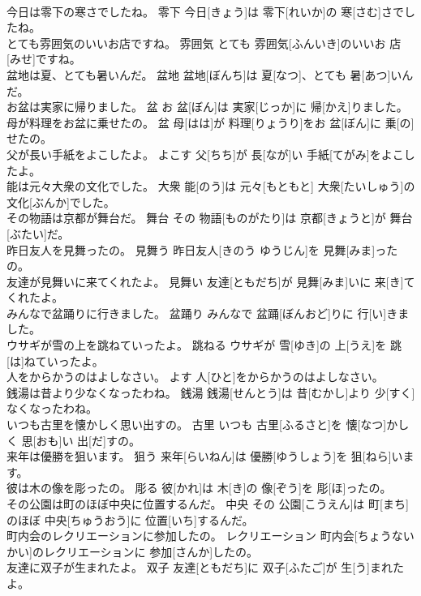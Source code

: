 \documentclass[8pt]{extreport}
\begin{document}
\begin{CJK}{UTF8}{min}
\\	今日は零下の寒さでしたね。	零下	今日[きょう]は 零下[れいか]の 寒[さむ]さでしたね。	
\\	とても雰囲気のいいお店ですね。	雰囲気	とても 雰囲気[ふんいき]のいいお 店[みせ]ですね。	
\\	盆地は夏、とても暑いんだ。	盆地	盆地[ぼんち]は 夏[なつ]、とても 暑[あつ]いんだ。	
\\	お盆は実家に帰りました。	盆	お 盆[ぼん]は 実家[じっか]に 帰[かえ]りました。	
\\	母が料理をお盆に乗せたの。	盆	母[はは]が 料理[りょうり]をお 盆[ぼん]に 乗[の]せたの。	
\\	父が長い手紙をよこしたよ。	よこす	父[ちち]が 長[なが]い 手紙[てがみ]をよこしたよ。	
\\	能は元々大衆の文化でした。	大衆	能[のう]は 元々[もともと] 大衆[たいしゅう]の 文化[ぶんか]でした。	
\\	その物語は京都が舞台だ。	舞台	その 物語[ものがたり]は 京都[きょうと]が 舞台[ぶたい]だ。	
\\	昨日友人を見舞ったの。	見舞う	昨日友人[きのう ゆうじん]を 見舞[みま]ったの。	
\\	友達が見舞いに来てくれたよ。	見舞い	友達[ともだち]が 見舞[みま]いに 来[き]てくれたよ。	
\\	みんなで盆踊りに行きました。	盆踊り	みんなで 盆踊[ぼんおど]りに 行[い]きました。	
\\	ウサギが雪の上を跳ねていったよ。	跳ねる	ウサギが 雪[ゆき]の 上[うえ]を 跳[は]ねていったよ。	
\\	人をからかうのはよしなさい。	よす	人[ひと]をからかうのはよしなさい。	
\\	銭湯は昔より少なくなったわね。	銭湯	銭湯[せんとう]は 昔[むかし]より 少[すく]なくなったわね。	
\\	いつも古里を懐かしく思い出すの。	古里	いつも 古里[ふるさと]を 懐[なつ]かしく 思[おも]い 出[だ]すの。	
\\	来年は優勝を狙います。	狙う	来年[らいねん]は 優勝[ゆうしょう]を 狙[ねら]います。	
\\	彼は木の像を彫ったの。	彫る	彼[かれ]は 木[き]の 像[ぞう]を 彫[ほ]ったの。	
\\	その公園は町のほぼ中央に位置するんだ。	中央	その 公園[こうえん]は 町[まち]のほぼ 中央[ちゅうおう]に 位置[いち]するんだ。	
\\	町内会のレクリエーションに参加したの。	レクリエーション	町内会[ちょうないかい]のレクリエーションに 参加[さんか]したの。	
\\	友達に双子が生まれたよ。	双子	友達[ともだち]に 双子[ふたご]が 生[う]まれたよ。	

\end{CJK}
\end{document}

